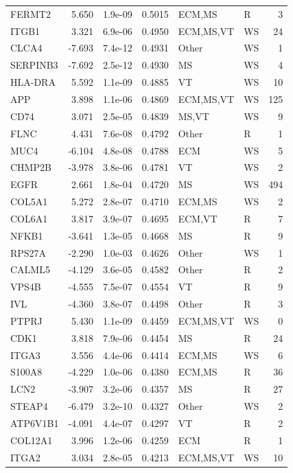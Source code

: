 \begin{table}[ht]
\begin{tabular}{lrlrllr}
  FERMT2 & 5.650 & 1.9e-09 & 0.5015 & ECM,MS & R & 3 \\ 
  ITGB1 & 3.321 & 6.9e-06 & 0.4950 & ECM,MS,VT & WS & 24 \\ 
  CLCA4 & -7.693 & 7.4e-12 & 0.4931 & Other & WS & 1 \\ 
  SERPINB3 & -7.692 & 2.5e-12 & 0.4930 & MS & WS & 4 \\ 
  HLA-DRA & 5.592 & 1.1e-09 & 0.4885 & VT & WS & 10 \\ 
  APP & 3.898 & 1.1e-06 & 0.4869 & ECM,MS,VT & WS & 125 \\ 
  CD74 & 3.071 & 2.5e-05 & 0.4839 & MS,VT & WS & 9 \\ 
  FLNC & 4.431 & 7.6e-08 & 0.4792 & Other & R & 1 \\ 
  MUC4 & -6.104 & 4.8e-08 & 0.4788 & ECM & WS & 5 \\ 
  CHMP2B & -3.978 & 3.8e-06 & 0.4781 & VT & WS & 2 \\ 
  EGFR & 2.661 & 1.8e-04 & 0.4720 & MS & WS & 494 \\ 
  COL5A1 & 5.272 & 2.8e-07 & 0.4710 & ECM,MS & WS & 2 \\ 
  COL6A1 & 3.817 & 3.9e-07 & 0.4695 & ECM,VT & R & 7 \\ 
  NFKB1 & -3.641 & 1.3e-05 & 0.4668 & MS & R & 9 \\ 
  RPS27A & -2.290 & 1.0e-03 & 0.4626 & Other & WS & 1 \\ 
  CALML5 & -4.129 & 3.6e-05 & 0.4582 & Other & R & 2 \\ 
  VPS4B & -4.555 & 7.5e-07 & 0.4554 & VT & R & 9 \\ 
  IVL & -4.360 & 3.8e-07 & 0.4498 & Other & R & 3 \\ 
  PTPRJ & 5.430 & 1.1e-09 & 0.4459 & ECM,MS,VT & WS & 0 \\ 
  CDK1 & 3.818 & 7.9e-06 & 0.4454 & MS & R & 24 \\ 
  ITGA3 & 3.556 & 4.4e-06 & 0.4414 & ECM,MS & WS & 6 \\ 
  S100A8 & -4.229 & 1.0e-06 & 0.4380 & ECM,MS & R & 36 \\ 
  LCN2 & -3.907 & 3.2e-06 & 0.4357 & MS & R & 27 \\ 
  STEAP4 & -6.479 & 3.2e-10 & 0.4327 & Other & WS & 2 \\ 
  ATP6V1B1 & -4.091 & 4.4e-07 & 0.4297 & VT & R & 2 \\ 
  COL12A1 & 3.996 & 1.2e-06 & 0.4259 & ECM & R & 1 \\ 
  ITGA2 & 3.034 & 2.8e-05 & 0.4213 & ECM,MS,VT & WS & 10 \\ 

\end{tabular}
\end{table}
